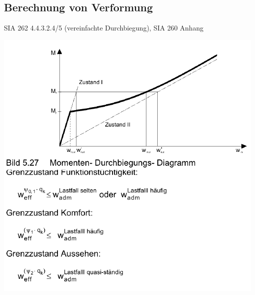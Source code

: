 	\begin{minipage}{0.4\linewidth}
			\subsection{Berechnung von Verformung}
		
		SIA 262 4.4.3.2.4/5 (vereinfachte Durchbiegung), SIA 260 Anhang
		
		\includegraphics[width=\linewidth]{images/Verformung2Durchbiegung.PNG}
		
	\end{minipage}
